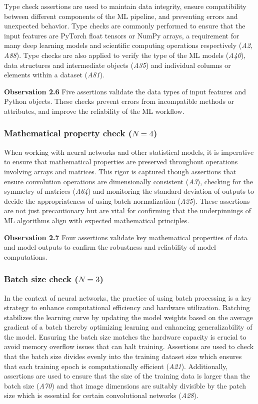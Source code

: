 \documentclass[journal]{IEEEtran}       %
\newcommand{\highlight}[1]{
  \begin{framed}%
    \noindent#1
\end{framed}}
\begin{document}
Type check assertions are used to maintain data integrity, ensure
compatibility between different components of the ML pipeline, and
preventing errors and unexpected behavior. Type checks are commonly
performed to ensure that the input features are PyTorch float tensors
or NumPy arrays, a requirement for many deep learning models and
scientific computing operations respectively (\emph{A2, A88}). Type
checks are also applied to verify the type of the ML models
(\emph{A40}), data structures and intermediate objects (\emph{A35})
and individual columns or elements within a dataset (\emph{A81}).

\highlight{\textbf{Observation 2.6} Five assertions validate the data
  types of input features and Python objects. These checks prevent
  errors from incompatible methods or attributes, and improve the
reliability of the ML workflow.}

\subsubsection{Mathematical property check ($N = 4$)}

When working with neural networks and other statistical models, it is
imperative to ensure that mathematical properties are preserved
throughout operations involving arrays and matrices. This rigor is
captured though assertions that ensure convolution operations are
dimensionally consistent (\emph{A3}), checking for the symmetry of
matrices (\emph{A64}) and monitoring the standard deviation of
outputs to decide the appropriateness of using batch normalization
(\emph{A25}). These assertions are not just precautionary but are
vital for confirming that the underpinnings of ML algorithms align
with expected mathematical principles.

\highlight{\textbf{Observation 2.7} Four assertions validate key
  mathematical properties of data and model outputs to confirm the
robustness and reliability of model computations.}

\subsubsection{Batch size check ($N = 3$)}

In the context of neural networks, the practice of using batch
processing is a key strategy to enhance computational efficiency and
hardware utilization. Batching stabilizes the learning curve by
updating the model weights based on the average gradient of a batch
thereby optimizing learning and enhancing generalizability of the
model. Ensuring the batch size matches the hardware capacity is
crucial to avoid memory overflow issues that can halt training.
Assertions are used to check that the batch size divides evenly into
the training dataset size which ensures that each training epoch is
computationally efficient (\emph{A21}). Additionally, assertions are
used to ensure that the size of the training data is larger than the
batch size (\emph{A70}) and that image dimensions are suitably
divisible by the patch size which is essential for certain
convolutional networks (\emph{A28}).
\end{document}
